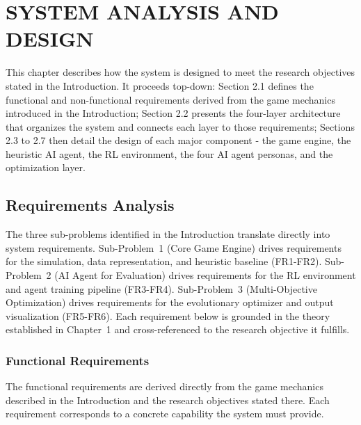 \clearpage
{}
\chapter{SYSTEM ANALYSIS AND DESIGN}

This chapter describes how the system is designed to meet the research objectives stated in the Introduction. It proceeds top-down: Section 2.1 defines the functional and non-functional requirements derived from the game mechanics introduced in the Introduction; Section 2.2 presents the four-layer architecture that organizes the system and connects each layer to those requirements; Sections 2.3 to 2.7 then detail the design of each major component - the game engine, the heuristic AI agent, the RL environment, the four AI agent personas, and the optimization layer.

\section{Requirements Analysis}

The three sub-problems identified in the Introduction translate directly into system requirements. Sub-Problem~1 (Core Game Engine) drives requirements for the simulation, data representation, and heuristic baseline (FR1-FR2). Sub-Problem~2 (AI Agent for Evaluation) drives requirements for the RL environment and agent training pipeline (FR3-FR4). Sub-Problem~3 (Multi-Objective Optimization) drives requirements for the evolutionary optimizer and output visualization (FR5-FR6). Each requirement below is grounded in the theory established in Chapter~1 and cross-referenced to the research objective it fulfills.

\subsection{Functional Requirements}

The functional requirements are derived directly from the game mechanics described in the Introduction and the research objectives stated there. Each requirement corresponds to a concrete capability the system must provide.

